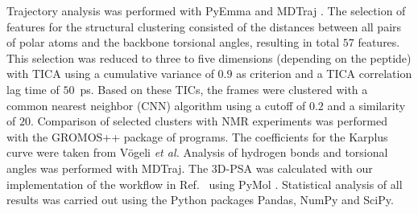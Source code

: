 Trajectory analysis was performed with PyEmma \cite{Scherer2015} and MDTraj \cite{Mcgibbon2015}. 
The selection of features for the structural clustering consisted of the distances between all pairs of polar atoms and the backbone torsional angles, resulting in total $57$ features. 
This selection was reduced to three to five dimensions (depending on the peptide) with TICA \cite{Molgedey1994} using a cumulative variance of $0.9$ as criterion and a TICA correlation lag time of $50$~ps. 
Based on these TICs, the frames were clustered with a common nearest neighbor (CNN) algorithm \cite{Keller2010, Weiss2021} using a cutoff of $0.2$ and a similarity of $20$. 
Comparison of selected clusters with NMR experiments was performed with the GROMOS++ package of programs. \cite{Eichenberger2011}
The coefficients for the Karplus curve were taken from Vögeli \textit{et al.} \cite{Voegeli2015}
Analysis of hydrogen bonds and torsional angles was performed with MDTraj. 
The 3D-PSA was calculated with our implementation \cite{Witek2019} of the workflow in Ref.~ using PyMol \cite{Delano2020}.
Statistical analysis of all results was carried out using the Python packages Pandas, NumPy and SciPy.\cite{Virtanen2020}

